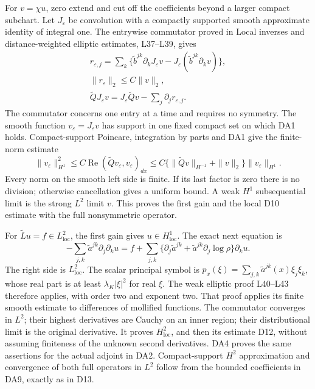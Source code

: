 \documentclass[
  11pt,
]{article}
\begin{document}
For \(v=\chi u\), zero extend and cut off the coefficients beyond a
larger compact subchart. Let \(J_\varepsilon\) be convolution with a
compactly supported smooth approximate identity of integral one. The
entrywise commutator proved in Local inverses and distance-weighted
elliptic estimates, L37--L39, gives \[
 \begin{gathered}
 r_{\varepsilon,j}=\sum_k\{\widetilde b^{jk}\partial_k J_\varepsilon v
                    -J_\varepsilon(\widetilde b^{jk}\partial_kv)\},\\
 \|r_\varepsilon\|_2\leq C\|v\|_2,\\
 \widetilde QJ_\varepsilon v=J_\varepsilon\widetilde Qv-\sum_j\partial_jr_{\varepsilon,j}.
 \end{gathered}\tag{DA7}
\] The commutator concerns one entry at a time and requires no symmetry.
The smooth function \(v_\varepsilon=J_\varepsilon v\) has support in one
fixed compact set on which DA1 holds. Compact-support Poincare,
integration by parts and DA1 give the finite-norm estimate \[
 \|v_\varepsilon\|_{H^1}^2
 \leq C\operatorname{Re}(\widetilde Qv_\varepsilon,v_\varepsilon)_{dx}
 \leq C\{\|\widetilde Qv\|_{H^{-1}}+\|v\|_2\}\|v_\varepsilon\|_{H^1}.
 \tag{DA8}
\] Every norm on the smooth left side is finite. If its last factor is
zero there is no division; otherwise cancellation gives a uniform bound.
A weak \(H^1\) subsequential limit is the strong \(L^2\) limit \(v\).
This proves the first gain and the local D10 estimate with the full
nonsymmetric operator.

For \(\widetilde L u=f\in L^2_{\mathrm{loc}}\), the first gain gives
\(u\in H^1_{\mathrm{loc}}\). The exact next equation is \[
 -\sum_{j,k}\widetilde a^{jk}\partial_j\partial_k u
 =f+\sum_{j,k}\{\partial_j\widetilde a^{jk}
                +\widetilde a^{jk}\partial_j\log\rho\}\partial_k u.
 \tag{DA9}
\] The right side is \(L^2_{\mathrm{loc}}\). The scalar principal symbol
is \(p_x(\xi)=\sum_{j,k}\widetilde a^{jk}(x)\xi_j\xi_k\), whose real
part is at least \(\lambda_K|\xi|^2\) for real \(\xi\). The weak
elliptic proof L40--L43 therefore applies, with order two and exponent
two. That proof applies its finite smooth estimate to differences of
mollified functions. The commutator converges in \(L^2\); their highest
derivatives are Cauchy on an inner region; their distributional limit is
the original derivative. It proves \(H^2_{\mathrm{loc}}\), and then its
estimate D12, without assuming finiteness of the unknown second
derivatives. DA4 proves the same assertions for the actual adjoint in
DA2. Compact-support \(H^2\) approximation and convergence of both full
operators in \(L^2\) follow from the bounded coefficients in DA9,
exactly as in D13.
\end{document}
